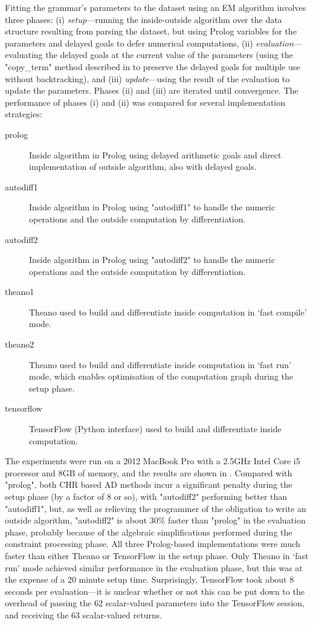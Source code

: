 Fitting the grammar's parameters to the dataset using an EM algorithm
involves three phases: (i) \emph{setup}---running the inside-outside algorithm over the
data structure resulting from parsing the dataset, but using Prolog variables
for the parameters and delayed goals to defer numerical computations,
(ii) \emph{evaluation}---evaluating the delayed goals 
at the current value of the parameters 
(using the "copy_term" method described in  to preserve
the delayed goals for multiple use without backtracking),
and (iii) \emph{update}---using the result of the evaluation to update
the parameters. Phases (ii) and (iii) are iterated until convergence.
The performance of phases (i) and (ii) was compared for several implementation
strategies:
\begin{description}
	\item[prolog]
	Inside algorithm in Prolog using delayed arithmetic goals
	and direct implementation of outside algorithm, also with delayed goals.

	\item[autodiff1]
	Inside algorithm in Prolog using "autodiff1" to handle
	the numeric operations and the outside computation by differentiation.

	\item[autodiff2]
	Inside algorithm in Prolog using "autodiff2" to handle
	the numeric operations and the outside computation by differentiation.

	\item[theano1]
		Theano used to build and differentiate inside computation in `fast compile' mode.

	\item[theano2]
		Theano used to build and differentiate inside computation in `fast run' mode,
		which enables optimisation of the computation graph during the setup phase.

	\item[tensorflow]
		TensorFlow (Python interface) used to build and differentiate inside computation.
\end{description}
The experiments were run on a 2012 MacBook Pro with a 2.5GHz Intel Core 
i5 processor and 8GB of memory, and the results are shown in .
Compared with "prolog", both CHR based AD methods 
incur a significant penalty during the setup phase (by a factor of 8 or 
so), with "autodiff2" performing better than "autodiff1", but, as well
as relieving the programmer of the obligation to write an outside algorithm,
"autodiff2" is about 30\% faster than "prolog" in the evaluation phase, probably
because of the algebraic simplifications performed during the constraint 
processing phase. All three Prolog-based implementations were much faster
than either Theano or TensorFlow in the setup phase. Only Theano in
`fast run' mode achieved similar performance in the evaluation phase, but
this was at the expense of a 20 minute setup time. Surprisingly, TensorFlow
took about 8 seconds per evaluation---it is unclear whether or not this
can be put down to the overhead of passing the 62 scalar-valued parameters 
into the TensorFlow session, and receiving the 63 scalar-valued returns.


